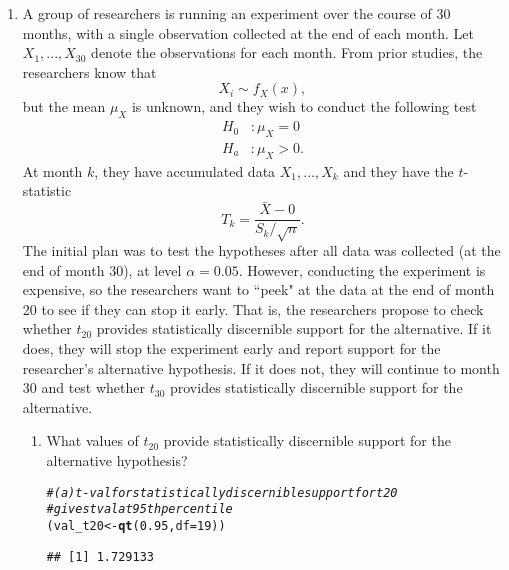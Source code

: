 \documentclass{article}\usepackage[]{graphicx}\usepackage[]{xcolor}
\makeatletter
\newcommand{\hlnum}[1]{\textcolor[rgb]{0.686,0.059,0.569}{#1}}%
\newcommand{\hlcom}[1]{\textcolor[rgb]{0.678,0.584,0.686}{\textit{#1}}}%
\newcommand{\hldef}[1]{\textcolor[rgb]{0.345,0.345,0.345}{#1}}%
\newcommand{\hlkwb}[1]{\textcolor[rgb]{0.69,0.353,0.396}{#1}}%
\newcommand{\hlkwc}[1]{\textcolor[rgb]{0.333,0.667,0.333}{#1}}%
\newcommand{\hlkwd}[1]{\textcolor[rgb]{0.737,0.353,0.396}{\textbf{#1}}}%
\newenvironment{kframe}{%
 \def\at@end@of@kframe{}%
 \ifinner\ifhmode%
  \def\at@end@of@kframe{\end{minipage}}%
  \begin{minipage}{\columnwidth}%
 \fi\fi%
 \def\FrameCommand##1{\hskip\@totalleftmargin \hskip-\fboxsep
 \colorbox{shadecolor}{##1}\hskip-\fboxsep
     \hskip-\linewidth \hskip-\@totalleftmargin \hskip\columnwidth}%
 \MakeFramed {\advance\hsize-\width
   \@totalleftmargin\z@ \linewidth\hsize
   \@setminipage}}%
 {\par\unskip\endMakeFramed%
 \at@end@of@kframe}
\newenvironment{knitrout}{}{} %
\makeatother
\begin{document}
\begin{enumerate}
\item A group of researchers is running an experiment over the course of 30 months, 
with a single observation collected at the end of each month. Let $X_1, ..., X_{30}$
denote the observations for each month. From prior studies, the researchers know that
\[X_i \sim f_X(x),\]
but the mean $\mu_X$ is unknown, and they wish to conduct the following test
\begin{align*}
H_0&: \mu_X = 0\\
H_a&: \mu_X > 0.
\end{align*}
At month $k$, they have accumulated data $X_1, ..., X_k$ and they have the 
$t$-statistic
\[T_k = \frac{\bar{X} - 0}{S_k/\sqrt{n}}.\]
The initial plan was to test the hypotheses after all data was collected (at the 
end of month 30), at level $\alpha=0.05$. However, conducting the experiment is 
expensive, so the researchers want to ``peek" at the data at the end of month 20 
to see if they can stop it early. That is, the researchers propose to check 
whether $t_{20}$ provides statistically discernible support for the alternative. 
If it does, they will stop the experiment early and report support for the 
researcher's alternative hypothesis. If it does not, they will continue to month 
30 and test whether $t_{30}$ provides statistically discernible support for the
alternative.

\begin{enumerate}
  \item What values of $t_{20}$ provide statistically discernible support for the
  alternative hypothesis?
  
\begin{knitrout}\scriptsize
{}\color{fgcolor}\begin{kframe}
\begin{alltt}
\hlcom{# (a) t-val for statistically discernible support for t20}
\hlcom{# gives t val at 95th percentile }
\hldef{(val_t20} \hlkwb{<-} \hlkwd{qt}\hldef{(}\hlnum{0.95}\hldef{,} \hlkwc{df}\hldef{=}\hlnum{19}\hldef{))}
\end{alltt}
\begin{verbatim}
## [1] 1.729133
\end{verbatim}
\end{kframe}
\end{knitrout}


\end{enumerate}
\end{enumerate}
\end{document}
